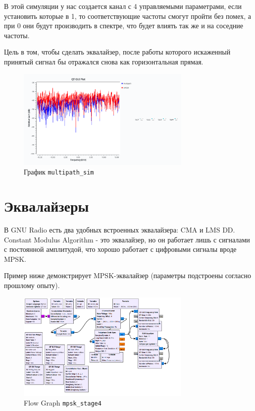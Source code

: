 \documentclass[a4paper,12pt]{report}
\begin{document}
    В этой симуляции у нас создается канал с 4 управляемыми параметрами, если установить которые в 1, то соответствующие частоты смогут пройти без помех, а при 0 они будут производить  в спектре, что будет влиять так же и на соседние частоты.
    
    Цель в том, чтобы сделать эквалайзер, после работы которого искаженный принятый сигнал бы отражался снова как горизонтальная прямая.
    
    \begin{figure}[H]
        \centering
        \includegraphics[width=0.75\textwidth]{images/multipath_sim_plot.png}
        \caption{График \texttt{multipath\_sim}}
        \label{fig:multipath_sim_plot}
    \end{figure}
    
    \chapter{Эквалайзеры}
    
    В GNU Radio есть два удобных встроенных эквалайзера: CMA и LMS DD. Constant Modulus Algorithm - это  эквалайзер, но он работает лишь с сигналами с постоянной амплитудой, что хорошо работает с цифровыми сигналы вроде MPSK.
    
    Пример ниже демонстрирует MPSK-эквалайзер (параметры подстроены согласно прошлому опыту).
    
    \begin{figure}[H]
        \centering
        \includegraphics[width=0.75\textwidth]{images/mpsk_stage4_fg.png}
        \caption{Flow Graph \texttt{mpsk\_stage4}}
        \label{fig:mpsk_stage4_fg}
    \end{figure}
    
\end{document}
